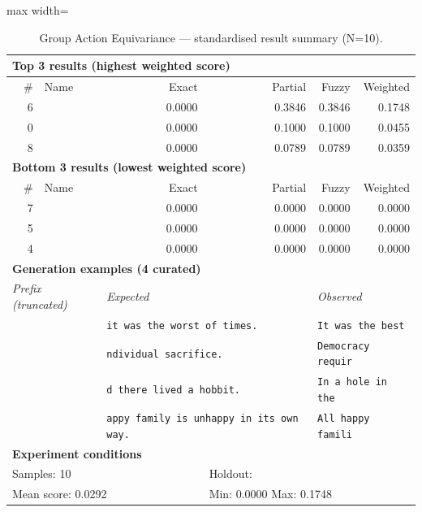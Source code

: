 \begin{table}[htbp]
\centering
\caption{Group Action Equivariance — standardised result summary (N=10).}
\label{tab:group_action_equivariance_summary}
\begin{adjustbox}{max width=\textwidth}
\begin{tabular}{r p{5cm} r r r r}
\toprule
\multicolumn{6}{l}{\textbf{Top 3 results (highest weighted score)}} \\
\midrule
\# & Name & Exact & Partial & Fuzzy & Weighted \\
\midrule
6 &  & 0.0000 & 0.3846 & 0.3846 & 0.1748 \\
0 &  & 0.0000 & 0.1000 & 0.1000 & 0.0455 \\
8 &  & 0.0000 & 0.0789 & 0.0789 & 0.0359 \\
\midrule
\multicolumn{6}{l}{\textbf{Bottom 3 results (lowest weighted score)}} \\
\midrule
\# & Name & Exact & Partial & Fuzzy & Weighted \\
\midrule
7 &  & 0.0000 & 0.0000 & 0.0000 & 0.0000 \\
5 &  & 0.0000 & 0.0000 & 0.0000 & 0.0000 \\
4 &  & 0.0000 & 0.0000 & 0.0000 & 0.0000 \\
\midrule
\multicolumn{6}{l}{\textbf{Generation examples (4 curated)}} \\
\midrule
\multicolumn{2}{l}{\textit{Prefix (truncated)}} & \multicolumn{2}{l}{\textit{Expected}} & \multicolumn{2}{l}{\textit{Observed}} \\
\midrule
\multicolumn{2}{l}{\texttt{}} & \multicolumn{2}{l}{\texttt{it was the worst of times.}} & \multicolumn{2}{l}{\texttt{It was the best}} \\
\multicolumn{2}{l}{\texttt{}} & \multicolumn{2}{l}{\texttt{ndividual sacrifice.}} & \multicolumn{2}{l}{\texttt{Democracy requir}} \\
\multicolumn{2}{l}{\texttt{}} & \multicolumn{2}{l}{\texttt{d there lived a hobbit.}} & \multicolumn{2}{l}{\texttt{In a hole in the}} \\
\multicolumn{2}{l}{\texttt{}} & \multicolumn{2}{l}{\texttt{appy family is unhappy in its own way.}} & \multicolumn{2}{l}{\texttt{All happy famili}} \\
\midrule
\multicolumn{6}{l}{\textbf{Experiment conditions}} \\
\midrule
\multicolumn{3}{l}{Samples: 10} & \multicolumn{3}{l}{Holdout: } \\
\multicolumn{3}{l}{Mean score: 0.0292} & \multicolumn{3}{l}{Min: 0.0000 \quad Max: 0.1748} \\

\end{tabular}
\end{adjustbox}
\end{table}
